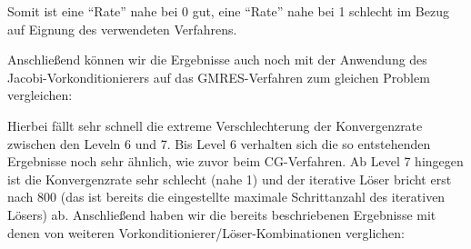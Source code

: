 \documentclass[12pt,a4paper]{scrartcl}
\numberwithin{equation}{section}
\begin{document}
Somit ist eine \enquote{Rate} nahe bei 0 gut, eine \enquote{Rate} nahe bei 1 schlecht im Bezug auf Eignung des verwendeten Verfahrens. 

Anschließend können wir die Ergebnisse auch noch mit der Anwendung des Jacobi-Vorkonditionierers auf das GMRES-Verfahren zum gleichen Problem vergleichen:

\begin{figure}[H]
	\centering
\end{figure}

Hierbei fällt sehr schnell die extreme Verschlechterung der Konvergenzrate zwischen den Leveln 6 und 7.
Bis Level 6 verhalten sich die so entstehenden Ergebnisse noch sehr ähnlich, wie zuvor beim CG-Verfahren.
Ab Level 7 hingegen ist die Konvergenzrate sehr schlecht (nahe 1) und der iterative Löser bricht erst nach 800 (das ist bereits die eingestellte maximale Schrittanzahl des iterativen Lösers) ab. 
\newline
Anschließend haben wir die bereits beschriebenen Ergebnisse mit denen von weiteren Vorkonditionierer/Löser-Kombinationen verglichen:

\begin{figure}[H]
	\centering
\end{figure}
\end{document}
